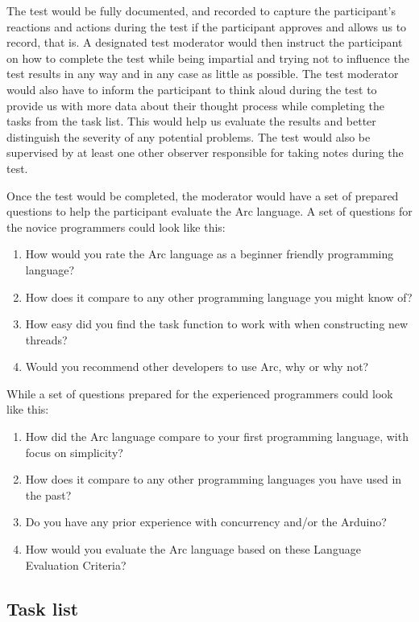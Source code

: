 The test would be fully documented, and recorded to capture the participant's reactions and actions during the test if the participant approves and allows us to record, that is. A designated test moderator would then instruct the participant on how to complete the test while being impartial and trying not to influence the test results in any way and in any case as little as possible. The test moderator would also have to inform the participant to think aloud during the test to provide us with more data about their thought process while completing the tasks from the task list. This would help us evaluate the results and better distinguish the severity of any potential problems. The test would also be supervised by at least one other observer responsible for taking notes during the test.

Once the test would be completed, the moderator would have a set of prepared questions to help the participant evaluate the Arc language. A set of questions for the novice programmers could look like this:

\begin{enumerate}
    \item How would you rate the Arc language as a beginner friendly programming language?
    \item How does it compare to any other programming language you might know of?
    \item How easy did you find the task function to work with when constructing new threads?
    \item Would you recommend other developers to use Arc, why or why not?
\end{enumerate}

While a set of questions prepared for the experienced programmers could look like this:

\begin{enumerate}
    \item How did the Arc language compare to your first programming language, with focus on simplicity?
    \item How does it compare to any other programming languages you have used in the past?
    \item Do you have any prior experience with concurrency and/or the Arduino?
    \item How would you evaluate the Arc language based on these Language Evaluation Criteria?
\end{enumerate}

\subsection{Task list}\label{subsubsec:taskList}


